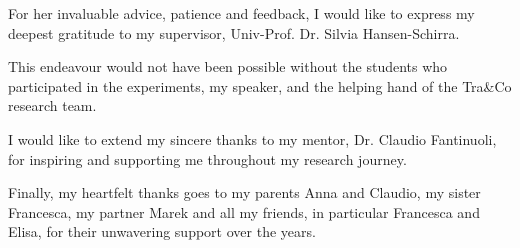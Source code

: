 \addchap{\lsAcknowledgementTitle} 
For her invaluable advice, patience and feedback, I would like to express my deepest gratitude to my supervisor, Univ-Prof. Dr. Silvia Hansen-Schirra.

This endeavour would not have been possible without the students who participated in the experiments, my speaker, and the helping hand of the Tra\&Co research team. 

I would like to extend my sincere thanks to my mentor, Dr. Claudio Fantinuoli, for inspiring and supporting me throughout my research journey.

Finally, my heartfelt thanks goes to my parents Anna and Claudio, my sister Francesca, my partner Marek and all my friends, in particular Francesca and Elisa, for their unwavering support over the years.
